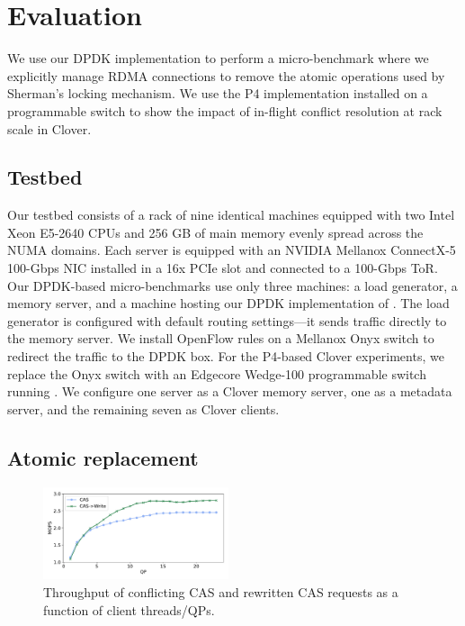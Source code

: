\section{Evaluation}
\label{s:results}


We use our DPDK implementation to perform a micro-benchmark where we explicitly
manage RDMA connections to remove the atomic operations used by Sherman's
locking mechanism.  We use the P4 implementation installed on a programmable
switch to show the impact of in-flight conflict resolution at rack scale in
Clover.


\subsection{Testbed} 

Our testbed consists of a rack of nine identical machines equipped
with two Intel Xeon E5-2640 CPUs and 256 GB of main memory evenly
spread across the NUMA domains. Each server is equipped with an
NVIDIA Mellanox ConnectX-5 100-Gbps NIC installed in a 16x PCIe slot and connected to a 100-Gbps ToR.  Our DPDK-based
micro-benchmarks use only three machines: a load generator, a memory
server, and a machine hosting our DPDK implementation of {\sword}.
The load generator is configured with default routing settings---it
sends traffic directly to the memory server.  We install OpenFlow
rules on a Mellanox Onyx switch to redirect the traffic to the DPDK
box.  For the P4-based Clover experiments, we replace the Onyx switch
with an Edgecore Wedge-100 programmable switch running \sword.
We configure one server as a Clover memory server, one as a metadata
server, and the remaining seven as Clover clients.

\subsection{Atomic replacement}

\begin{figure}[t]
    \includegraphics[width=0.485\textwidth]{fig/cas_vs_swap.pdf}
    \caption{Throughput of conflicting CAS and rewritten CAS requests as a function of client threads/QPs.}
    \label{fig:cas_vs_swap}
\end{figure}

